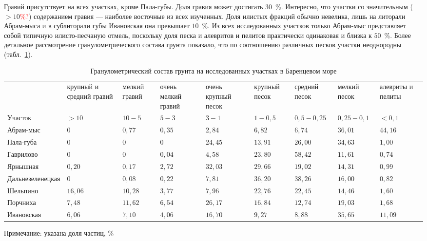 Гравий присутствует на всех участках, кроме Пала-губы.  
Доля  гравия может достигать $30$~\%. 
Интересно, что участки со значительным ($> 10$\textcolor{red}{\%?}) содержанием   гравия  ---  наиболее   восточные   из   всех   изученных.   
Доля   илистых   фракций обычно   невелика,   лишь   на   литорали   Абрам-мыса   и   в   сублиторали   губы   Ивановская   она превышает   $10$~\%.   
Из   всех   исследованных   участков   только   Абрам-мыс   представляет   собой типичную илисто-песчаную отмель, поскольку доля песка и алевритов и пелитов практически одинаковая и близка к $50$~\%.
Более детальное рассмотрение гранулометрического состава грунта показало, что по соотношению различных песков участки неоднородны (табл.~\ref{tab:grunt_granulometriya_Barents}).
    \begin{table}[ht]
    \caption{Гранулометрический состав грунта на исследованных участках в Баренцевом море}
    \label{tab:grunt_granulometriya_Barents}
    \begin{tabularx}{\textwidth}{|p{}|*{8}{X|}} \hline
    & круп\-ный и сред\-ний гравий  &  мел\-кий гра\-вий &  очень мел\-кий гра\-вий & очень круп\-ный песок & круп\-ный песок &  сред\-ний песок & мел\-кий песок & алеври\-ты и пели\-ты \\
        Участок &   $>10$ &  $10-5$ &   $5-3$ &  $3-1$ & $1-0,5$ &   $0,5-0,25$ &    $0,25-0,1$ &    $<0,1$
        \\ \hline
    Абрам-мыс &  $0$ &  $0,77$ &  $0,35$ &  $2,84$ &  $6,82$ &  $6,74$ & $36,01$ &  $44,16$
        \\ \hline
        Пала-губа  &  $0$ &  $0$ &  $0$ &  $24,45$ &  $13,91$ &  $26,00$ &  $34,63$ &  $1,00$
        \\ \hline
        Гаврилово &  $0$ &  $0$ &  $0,04$ &   $4,58$ &   $23,80$ &  $58,42$ &  $11,61$ &  $0,74$
        \\ \hline
        Ярнышная  &  $0,20$ &  $0,17$  &  $2,72$ &  $32,03$ &  $29,66$ &  $19,02$ &  $14,31$  &  $0,99$
        \\ \hline
        Даль\-не\-зе\-ле\-нец\-кая &  $0$ &  $0,08$ &    $0,22$ &    $7,81$ &    $36,20$ &  $38,26$ &   $16,00$ &   $0,82$
        \\ \hline
    Шельпино  &  $16,06$ &   $10,28$ &   $3,77$ &  $7,96$  &  $22,76$ &  $22,45$ &    $14,46$ &  $1,60$ 
        \\ \hline
    Порчниха  &  $7,48$ &   $11,62$ &  $6,54$ &   $26,17$ &  $16,84$ &  $12,74$ &  $19,03$ &  $1,68$ 
        \\ \hline
    Ивановская &  $6,06$ &    $7,10$ &   $4,06$ &   $16,70$ &  $9,27$ &   $8,88$ &   $35,65$ &  $11,09$
        \\ \hline
    \end{tabularx}

    {\footnotesize Примечание: указана доля частиц, \%}
    \end{table}


